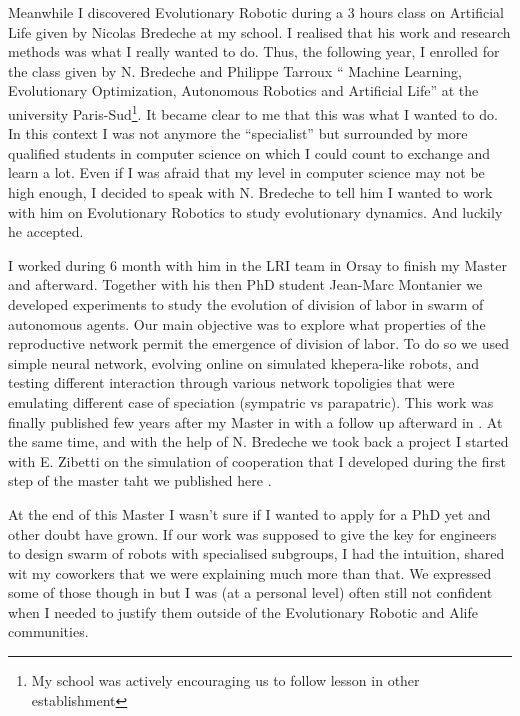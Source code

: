 \documentclass[10pt]{article}
\begin{document}
Meanwhile I discovered Evolutionary Robotic during a 3 hours class on Artificial Life given by  Nicolas Bredeche at my school. I realised that his work and research methods was what I really wanted to do. Thus, the following
year, I enrolled for the class given by N. Bredeche and Philippe Tarroux `` Machine Learning, Evolutionary Optimization, Autonomous Robotics and Artificial Life'' at the university Paris-Sud\footnote{My school was actively encouraging us to follow lesson in other establishment}. It became clear to me that this was what I wanted to do. In this context I was not anymore the ``specialist'' but surrounded by  more qualified students in computer science on which I could count to exchange and learn a lot. Even if I was afraid that my level in computer science may not be high enough, I decided to speak with N. Bredeche to tell him I wanted to work with him on Evolutionary Robotics to study evolutionary dynamics. And luckily he accepted.

I worked during 6 month with him in the LRI team in Orsay to finish my Master and afterward. Together with his then PhD student Jean-Marc Montanier we developed experiments to study the evolution of division of labor in swarm of autonomous agents. Our main objective was to explore what properties of the reproductive network permit the emergence of division of labor. To do so we used simple neural network, evolving online on simulated khepera-like robots, and testing different interaction through various network topoligies that were emulating different case of speciation (sympatric vs parapatric). This work was finally published few years after my Master in \cite{montanier2016behavioralspecializationinembodiedevolutionaryroboticswhysodifficult} with a follow up afterward in \cite{bredeche2017benefitsofproportionateselectioninembodiedevolutionacasestudywithbehaviouralspecialization}. At the same time, and with the help of N. Bredeche we took back a project I started with E. Zibetti on the simulation of cooperation that I developed during the first step of the master taht we published  here \cite{zibetti2015acaciaesanagentbasedmodelingandsimulationtoolforinvestigatingsocialbehaviorsinresourcelimitedtwodimensionalenvironments}.

At the end of this Master I wasn't sure if I wanted to apply for a PhD yet and other doubt have grown. If our work was supposed to give the key for engineers to design swarm of robots with specialised subgroups, I had the intuition, shared wit my coworkers that we were explaining much more than that. We expressed some of those though in \cite{bredeche11evolutionaryadaptationpopulationrobots} but I was (at a personal level) often still not confident when I needed to justify them outside of the Evolutionary Robotic and Alife communities.
\end{document}
